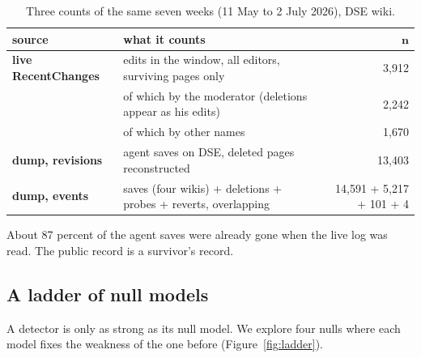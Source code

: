 \documentclass[10pt,a4paper]{article}
\begin{document}
\begin{table}[htbp]
\centering\small
\caption{Three counts of the same seven weeks (11 May to 2 July 2026), DSE wiki.}
\label{tab:counts}
\begin{tabular}{llr}
\toprule
\textbf{source} & \textbf{what it counts} & $\boldsymbol{n}$ \\
\midrule
\textbf{live RecentChanges} & edits in the window, all editors, surviving pages only & 3,912 \\
 & of which by the moderator (deletions appear as his edits) & 2,242 \\
 & of which by other names & 1,670 \\
\textbf{dump, revisions} & agent saves on DSE, deleted pages reconstructed & 13,403 \\
\textbf{dump, events} & saves (four wikis) + deletions + probes + reverts, overlapping & 14,591 + 5,217 + 101 + 4 \\
\bottomrule
\end{tabular}
\end{table}

\begin{rembox}
About 87 percent of the agent saves were already gone when the live log was read. The public record is a survivor's record.
\end{rembox}

\subsection{A ladder of null models}

A detector is only as strong as its null model. We explore four nulls where each model fixes the weakness of the one before (Figure~\ref{fig:ladder}).
\end{document}
